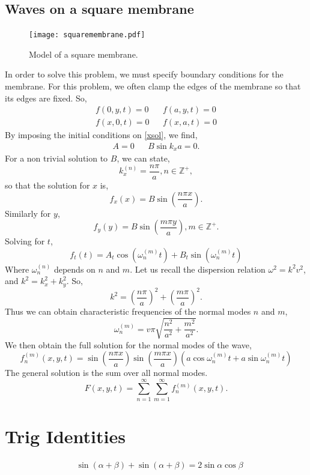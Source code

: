 \documentclass{book}
\begin{document}
\section{Waves on a square membrane}
\begin{figure}[h]
	\centering
	\texttt{[image: squaremembrane.pdf]}
	\caption{Model of a square membrane.}
	\label{squaremembrane}
\end{figure}
In order to solve this problem, we must specify boundary conditions for the membrane. For this problem, we often clamp the edges of the membrane so that its edges are fixed. So,
\begin{align}
	f(0,y,t) = 0 && f(a,y,t) = 0\\
	f(x,0,t) = 0 && f(x,a,t) = 0
\end{align}
By imposing the initial conditions on \eqref{xsol}, we find,
\begin{align}
	A = 0 && B\sin k_xa = 0.
\end{align}
For a non trivial solution to $B$, we can state,
\begin{equation}
	k_x^{(n)} = \frac{n\pi}{a}, n\in \mathbb{Z}^+,
\end{equation}
so that the solution for $x$ is,
\begin{equation}
	f_x(x) = B\sin\left(\frac{n\pi x}{a}\right).
\end{equation}
Similarly for $y$,
\begin{equation}
	f_y(y) = B\sin\left(\frac{m\pi y}{a}\right), m \in \mathbb{Z}^+.
\end{equation}
Solving for $t$,
\begin{equation}
	f_t(t) = A_t\cos(\omega_{n}^{(m)} t) + B_t \sin(\omega_{n}^{(m)} t)
\end{equation}
Where $\omega_n^{(n)}$ depends on $n$ and $m$. Let us recall the dispersion relation $\omega^2 = k^2v^2$, and $k^2 = k_x^2 + k_y^2$. So,
\begin{equation}
	k^2 = \left(\frac{n\pi}{a}\right)^2 + \left(\frac{m\pi}{a}\right)^2.
\end{equation}
Thus we can obtain characteristic frequencies of the normal modes $n$ and $m$,
\begin{equation}
	\omega_n^{(m)} = v\pi\sqrt{\frac{n^2}{a^2} + \frac{m^2}{a^2}}.
\end{equation}
We then obtain the full solution for the normal modes of the wave,
\begin{equation}
	f_n^{(m)}(x,y,t) = \sin\left(\frac{n\pi x}{a}\right)\sin\left(\frac{m\pi x}{a}\right)\left(a\cos\omega_n^{(m)}t + a\sin\omega_n^{(m)}t\right)
\end{equation}
The general solution is the sum over all normal modes.
\begin{equation}
	F(x,y,t) = \sum_{n=1}^{\infty}\sum_{m=1}^{\infty}f_n^{(m)}(x,y,t).
\end{equation}
\chapter{Trig Identities}
\begin{align}
	& \sin(\alpha + \beta) + \sin(\alpha + \beta) = 2\sin\alpha\cos\beta \label{id1}
\end{align}
\end{document}

